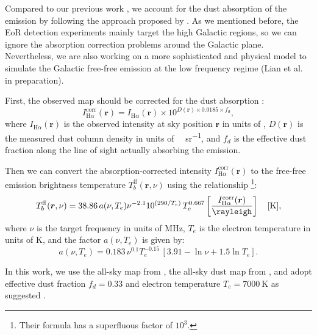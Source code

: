 \documentclass[modern]{aastex61}
\newcommand{\R}[1]{\mathrm{#1}}
\newcommand{\Halpha}{\text{H$\alpha$}}
\begin{document}
Compared to our previous work \citep{wang2010}, we account for the
dust absorption of the \Halpha{} emission by following the approach
proposed by \citet{dickinson2003}.
As we mentioned before, the EoR detection experiments mainly target
the high Galactic regions, so we can ignore the absorption correction
problems around the Galactic plane.
Nevertheless, we are also working on a more sophisticated and
physical model to simulate the Galactic free-free emission at the low
frequency regime (Lian et al. in preparation).

First, the observed \Halpha{} map should be corrected for the dust
absorption \citep{dickinson2003}:
\begin{equation}
  \label{eq:halpha-dust-corr}
  I_{\Halpha}^{\R{corr}}(\bm{r}) = I_{\Halpha}(\bm{r}) \times
    10^{D(\bm{r}) \times 0.0185 \times f_d},
\end{equation}
where $I_{\Halpha}(\bm{r})$ is the observed \Halpha{} intensity at sky
position $\bm{r}$ in units of \si{\rayleigh},
$D(\bm{r})$ is the measured dust column density in units of
\si{\mega\jansky\per\steradian},
and $f_d$ is the effective dust fraction along the line of sight actually
absorbing the \Halpha{} emission.

Then we can convert the absorption-corrected \Halpha{} intensity
$I_{\Halpha}^{\R{corr}}(\bm{r})$ to the free-free emission brightness
temperature $T_b^{\R{ff}}(\bm{r}, \nu)$
using the relationship \citep{dickinson2003}
\footnote{Their formula has a superfluous factor of $10^3$.}:
\begin{equation}
  \label{eq:halpha-ff}
  T_b^{\R{ff}}(\bm{r}, \nu) = 38.86 \, a(\nu, T_e) \nu^{-2.1}
    10^{(290 / T_e)} \, T_e^{0.667}
    \left[ \frac{I_{\Halpha}^{\R{corr}}(\bm{r})}{\si{\rayleigh}} \right]
    \quad [\si{\kelvin}],
\end{equation}
where $\nu$ is the target frequency in units of \si{\MHz},
$T_e$ is the electron temperature in units of \si{\kelvin},
and the factor $a(\nu, T_e)$ is given by:
\begin{equation}
  a(\nu, T_e) = 0.183 \,\nu^{0.1} T_e^{-0.15}
    \, [ 3.91 - \ln \nu + 1.5 \ln T_e ].
\end{equation}

In this work, we use the all-sky \Halpha{} map from \citet{finkbeiner2003},
the all-sky dust map from \citet{schlegel1998}, and
adopt effective dust fraction $f_d = 0.33$ and
electron temperature $T_e = \SI{7000}{\kelvin}$
as suggested \citep{dickinson2003}.


\end{document}
